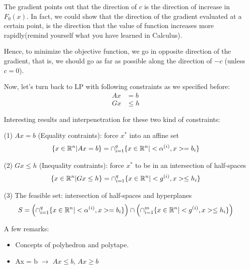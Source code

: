 The gradient points out that the direction of $c$ is the direction of increase in $F_0(x)$. In fact, we could show that the direction of the gradient evaluated at a certain point, is the direction that the value of function increases more rapidly(remind yourself what you have learned in Calculus).

Hence, to minimize the objective function, we go in opposite direction of the gradient, that is, we should go as far as possible along the direction of $-c$ (unless $c=0$).


\vspace{0.5cm}
Now, let's turn back to LP with following constraints as we specified before:
\begin{align*}
	Ax &= b\\
	Gx &\leq h
\end{align*}

Interesting results and interpenetration for these two kind of constraints:

(1) $Ax=b$ (Equality contraints): force $x^*$ into an affine set
$$\{x\in \mathbb{R}^n|Ax = b \} =  \cap^q_{i=1}\{x\in \mathbb{R}^n|<\alpha^{(i)}, x> = b_i \}$$

(2) $Gx\leq h$ (Inequality contraints): force $x^*$ to be in an intersection of half-spaces
$$\{x\in \mathbb{R}^n|Gx \leq h \} =  \cap^q_{i=1}\{x\in \mathbb{R}^n| <g^{(i)}, x> \leq h_i \}$$

(3) The feasible set: intersection of half-spaces and hyperplanes
$$
S = \left(\cap^q_{i=1}\{x\in \mathbb{R}^n | <\alpha^{(i)}, x> = b_i \}\right) \cap \left(\cap^m_{i=1}\{x\in \mathbb{R}^n | <g^{(i)}, x> \leq h_i \}\right)
$$


A few remarks:
\begin{itemize}
	\item Concepts of polyhedron and polytape.
	
	\item Ax = b $\rightarrow$ $Ax \leq b$, $Ax \geq b$
\end{itemize}



